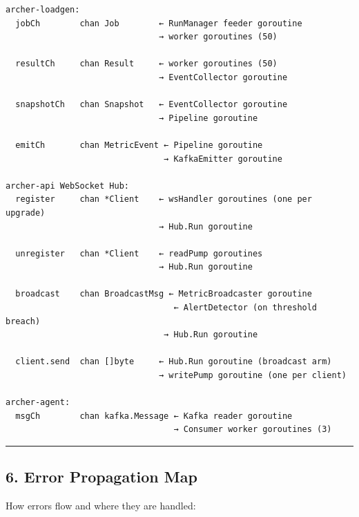 \documentclass[
]{article}
\begin{document}
\begin{verbatim}
archer-loadgen:
  jobCh        chan Job        ← RunManager feeder goroutine
                               → worker goroutines (50)

  resultCh     chan Result     ← worker goroutines (50)
                               → EventCollector goroutine

  snapshotCh   chan Snapshot   ← EventCollector goroutine
                               → Pipeline goroutine

  emitCh       chan MetricEvent ← Pipeline goroutine
                                → KafkaEmitter goroutine

archer-api WebSocket Hub:
  register     chan *Client    ← wsHandler goroutines (one per upgrade)
                               → Hub.Run goroutine

  unregister   chan *Client    ← readPump goroutines
                               → Hub.Run goroutine

  broadcast    chan BroadcastMsg ← MetricBroadcaster goroutine
                                  ← AlertDetector (on threshold breach)
                                → Hub.Run goroutine

  client.send  chan []byte     ← Hub.Run goroutine (broadcast arm)
                               → writePump goroutine (one per client)

archer-agent:
  msgCh        chan kafka.Message ← Kafka reader goroutine
                                  → Consumer worker goroutines (3)
\end{verbatim}

\begin{center}\rule{0.5\linewidth}{0.5pt}\end{center}

\hypertarget{error-propagation-map}{%
\subsection{6. Error Propagation Map}\label{error-propagation-map}}

How errors flow and where they are handled:
\end{document}
